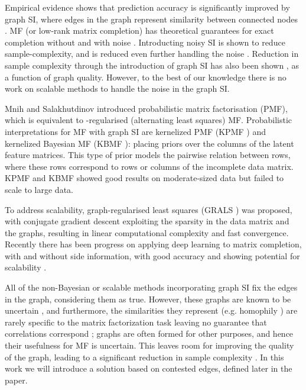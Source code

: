 \documentclass{article}
\theoremstyle{plain}
\theoremstyle{definition}
\theoremstyle{remark}
\begin{document}
Empirical evidence shows that prediction accuracy is significantly improved by graph SI, where edges in the graph represent similarity between connected nodes \cite{cai2011graph,ma2011recommender,monti2017geometric,rao2015collaborative,yao2018convolutional,zhou2012kernelized,zhao2015expert}. MF (or low-rank matrix completion) has theoretical guarantees for exact completion without and with noise \cite{candes2010matrix,candes2009exact}. 
Introducting noisy SI is shown to reduce sample-complexity, and is reduced even further handling the noise \cite{chiang2015matrix}. Reduction in sample complexity through the introduction of graph SI has also been shown \cite{ahn2018binary,rao2015collaborative}, as a function of graph quality.  However, to the best of our knowledge there is no work on scalable methods to handle the noise in the graph SI.

Mnih and Salakhutdinov  \cite{mnih2008probabilistic} introduced probabilistic matrix factorisation (PMF), which is equivalent to -regularised (alternating least squares) MF. Probabilistic interpretations for MF with graph SI are kernelized PMF (KPMF  \cite{zhou2012kernelized}) and kernelized Bayesian MF (KBMF \cite{gonen2013kernelized}): placing priors over the columns of the latent feature matrices. This type of prior models the pairwise relation between rows, where these rows correspond to rows or columns of the incomplete data matrix. KPMF and KBMF showed good results on moderate-sized data but failed to scale to large data. 

To address scalability, graph-regularised least squares (GRALS \cite{rao2015collaborative}) was  proposed, with conjugate gradient descent exploiting the sparsity in the data matrix and the graphs, resulting in linear computational complexity and fast convergence. Recently there has been progress on applying deep learning to matrix completion, with and without side information, with good accuracy and showing potential for scalability \cite{berg2017graph,hartford2018deep,monti2017geometric,yao2018convolutional}.

All of the non-Bayesian or scalable methods incorporating graph SI \cite{cai2011graph,ma2011recommender,monti2017geometric,rao2015collaborative,zhou2012kernelized} fix the edges in the graph, considering them as true.  However, these graphs are known to be uncertain \cite{adar2007managing,asthana2004predicting}, and furthermore, the similarities they represent (e.g. homophily \cite{mcpherson2001birds}) are rarely specific to the matrix factorization task leaving no guarantee that correlations correspond \cite{ma2011recommender,singla2008yes}; graphs are often formed for other purposes, and hence their usefulness for MF is uncertain. This leaves room for improving the quality of the graph, leading to a significant reduction in sample complexity \cite{ahn2018binary}. In this work we will introduce a solution based on contested edges, defined later in the paper.
\end{document}
